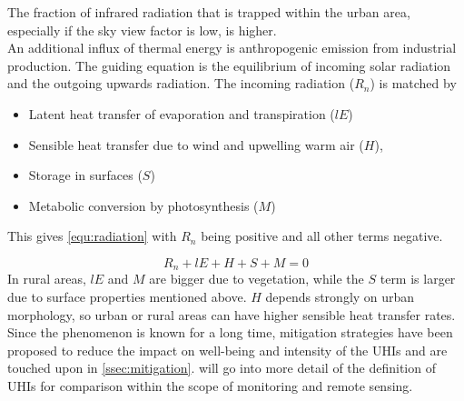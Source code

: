 \documentclass[12pt,a4paper, english,twoside]{scrartcl}
\begin{document}
    The fraction of infrared radiation that is trapped within the urban area, especially if the sky view factor is low, is higher.\\ 
    An additional influx of thermal energy is anthropogenic emission from industrial production.
    \noindent 
    The guiding equation is the equilibrium of incoming solar radiation and the outgoing upwards radiation. 
    The incoming radiation ($R_n$) is matched by
  \begin{itemize}
    \item Latent heat transfer of evaporation and transpiration ($lE$)
    \item Sensible heat transfer due to wind and upwelling warm air ($H$), 
    \item Storage in surfaces ($S$)
    \item Metabolic conversion by photosynthesis ($M$)
  \end{itemize}
    This gives \cref{equ:radiation} with $R_n$ being positive and all other terms negative.

    \begin{equation}\label{equ:radiation}
      R_n + lE + H + S + M = 0
    \end{equation}
    \noindent 
    In rural areas, $lE$ and $M$ are bigger due to vegetation, while the $S$ term is larger due to surface properties mentioned above.
    $H$ depends strongly on urban morphology, so urban or rural areas can have higher sensible heat transfer rates.\\

    Since the phenomenon is known for a long time, mitigation strategies have been proposed to reduce the impact on well-being and intensity of the \glspl{UHI} and are touched upon in \cref{ssec:mitigation}.
     will go into more detail of the definition of \glspl{UHI} for comparison within the scope of monitoring and remote sensing. 
\end{document}
